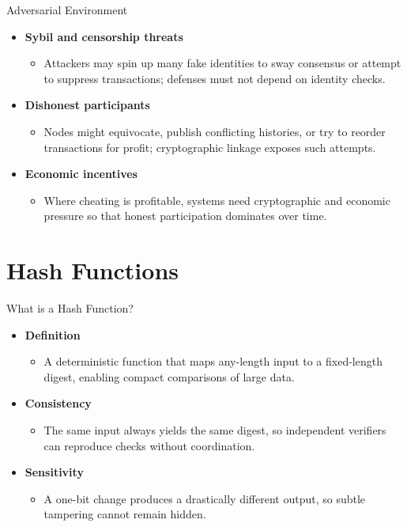 \documentclass[aspectratio=169]{beamer}
\begin{document}
\begin{frame}{Adversarial Environment}
  \begin{itemize}
    \item \textbf{Sybil and censorship threats}
      \begin{itemize}
        \item Attackers may spin up many fake identities to sway consensus or attempt to suppress transactions; defenses must not depend on identity checks.
      \end{itemize}
    \item \textbf{Dishonest participants}
      \begin{itemize}
        \item Nodes might equivocate, publish conflicting histories, or try to reorder transactions for profit; cryptographic linkage exposes such attempts.
      \end{itemize}
    \item \textbf{Economic incentives}
      \begin{itemize}
        \item Where cheating is profitable, systems need cryptographic and economic pressure so that honest participation dominates over time.
      \end{itemize}
  \end{itemize}
\end{frame}

\section{Hash Functions}

\begin{frame}{What is a Hash Function?}
  \begin{itemize}
    \item \textbf{Definition}
      \begin{itemize}
        \item A deterministic function that maps any-length input to a fixed-length digest, enabling compact comparisons of large data.
      \end{itemize}
    \item \textbf{Consistency}
      \begin{itemize}
        \item The same input always yields the same digest, so independent verifiers can reproduce checks without coordination.
      \end{itemize}
    \item \textbf{Sensitivity}
      \begin{itemize}
        \item A one-bit change produces a drastically different output, so subtle tampering cannot remain hidden.
      \end{itemize}
  \end{itemize}
\end{frame}
\end{document}
